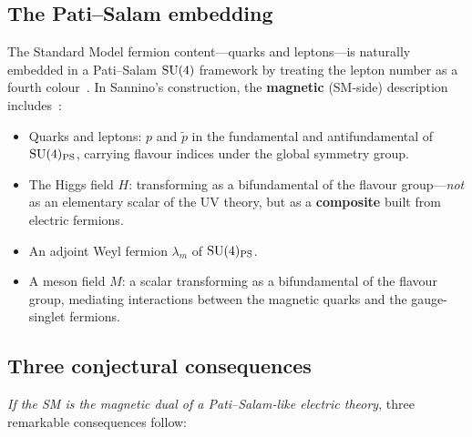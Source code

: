 \documentclass[11pt,a4paper]{article}
\begin{document}
\subsection{The Pati--Salam embedding}

The Standard Model fermion content---quarks and leptons---is naturally
embedded in a Pati--Salam $\mathrm{SU}(4)$ framework by treating the lepton
number as a fourth colour~\cite{PS1974}.  In Sannino's construction,
the \textbf{magnetic} (SM-side) description includes~\cite{Sannino2011}:
\begin{itemize}
  \item Quarks and leptons: $p$ and $\widetilde{p}$ in the
    fundamental and antifundamental of $\mathrm{SU}(4)_{\mathrm{PS}}$,
    carrying flavour indices under the global symmetry group.
  \item The Higgs field $H$: transforming as a bifundamental of the
    flavour group---\emph{not} as an elementary scalar of the UV
    theory, but as a \textbf{composite} built from electric fermions.
  \item An adjoint Weyl fermion $\lambda_m$ of $\mathrm{SU}(4)_{\mathrm{PS}}$.
  \item A meson field $M$: a scalar transforming as a bifundamental
    of the flavour group, mediating interactions between the magnetic
    quarks and the gauge-singlet fermions.
\end{itemize}

\subsection{Three conjectural consequences}

\emph{If the SM is the magnetic dual of a Pati--Salam-like electric
theory}, three remarkable consequences follow:
\end{document}
